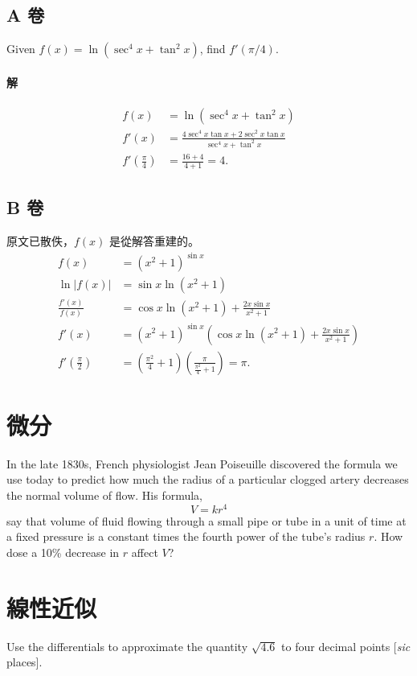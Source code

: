 \documentclass[a4paper,12pt]{article}
\begin{document}
\begin{CJK}{UTF8}{bsmi}
\subsection{A 卷}
Given $f(x) = \ln(\sec^4 x + \tan^2 x)$, find $f'(\pi/4)$.

\paragraph{解}
\begin{align*}
f(x) &= \ln(\sec^4 x + \tan^2 x)\\
f'(x) &= \frac{4 \sec^4 x \tan x + 2 \sec^2 x \tan x}{\sec^4 x + \tan^2 x}\\
f'\left(\frac{\pi}{4}\right) &= \frac{16 + 4}{4 + 1} = 4.
\end{align*}

\subsection{B 卷}
原文已散佚，$f(x)$ 是從解答重建的。
\begin{align*}
f(x) &= (x^2 + 1)^{\sin x}\\
\ln |f(x)| &= \sin x \ln(x^2 + 1)\\
\frac{f'(x)}{f(x)} &= \cos x \ln(x^2 + 1) + \frac{2x \sin x}{x^2 + 1}\\
f'(x) &= (x^2 + 1)^{\sin x} \left(\cos x \ln(x^2 + 1) + \frac{2x \sin x}{x^2 + 1}\right)\\
f'(\frac{\pi}{2}) &= \left(\frac{\pi^2}{4} + 1\right)\left(\frac{\pi}{\frac{\pi^2}{4} + 1}\right) = \pi.
\end{align*}

\section{微分}
In the late 1830s, French physiologist Jean Poiseuille discovered the formula we use today to predict how much the radius of
a particular clogged artery decreases the normal volume of flow. His formula,
\[V = kr^4\]
say that volume of fluid flowing through a small pipe or tube in a unit of time at a fixed pressure is a constant times the
fourth power of the tube’s radius $r$. How dose a 10\% decrease in $r$ affect $V$?

\section{線性近似}
Use the differentials to approximate the quantity $\sqrt{4.6}$ to four decimal points [\textit{sic} places].


\end{CJK}
\end{document}
